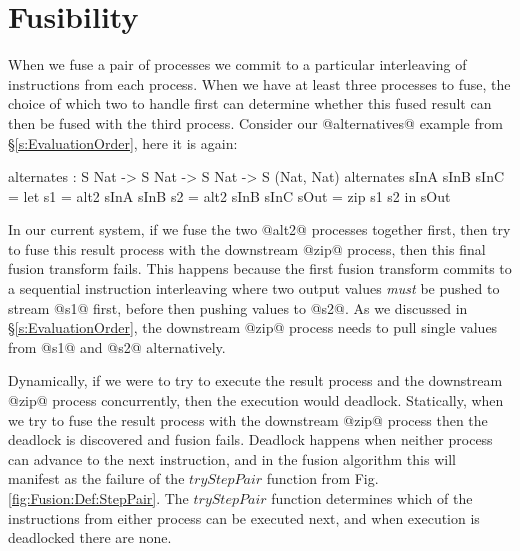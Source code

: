 \section{Fusibility}
\label{s:FusionOrder}
When we fuse a pair of processes we commit to a particular interleaving of instructions from each process. When we have at least three processes to fuse, the choice of which two to handle first can determine whether this fused result can then be fused with the third process. Consider our @alternatives@ example from \S\ref{s:EvaluationOrder}, here it is again:
\begin{code}
  alternates : S Nat -> S Nat -> S Nat -> S (Nat, Nat)
  alternates sInA sInB sInC
   = let  s1   = alt2 sInA sInB
          s2   = alt2 sInB sInC
          sOut = zip s1 s2
     in   sOut
\end{code}

In our current system, if we fuse the two @alt2@ processes together first, then try to fuse this result process with the downstream @zip@ process, then this final fusion transform fails. This happens because the first fusion transform commits to a sequential instruction interleaving where two output values \emph{must} be pushed to stream @s1@ first, before then pushing values to @s2@. As we discussed in \S\ref{s:EvaluationOrder}, the downstream @zip@ process needs to pull single values from @s1@ and @s2@ alternatively.

Dynamically, if we were to try to execute the result process and the downstream @zip@ process concurrently, then the execution would deadlock. Statically, when we try to fuse the result process with the downstream @zip@ process then the deadlock is discovered and fusion fails. Deadlock happens when neither process can advance to the next instruction, and in the fusion algorithm this will manifest as the failure of the $tryStepPair$ function from Fig.\ref{fig:Fusion:Def:StepPair}. The $tryStepPair$ function determines which of the instructions from either process can be executed next, and when execution is deadlocked there are none.

